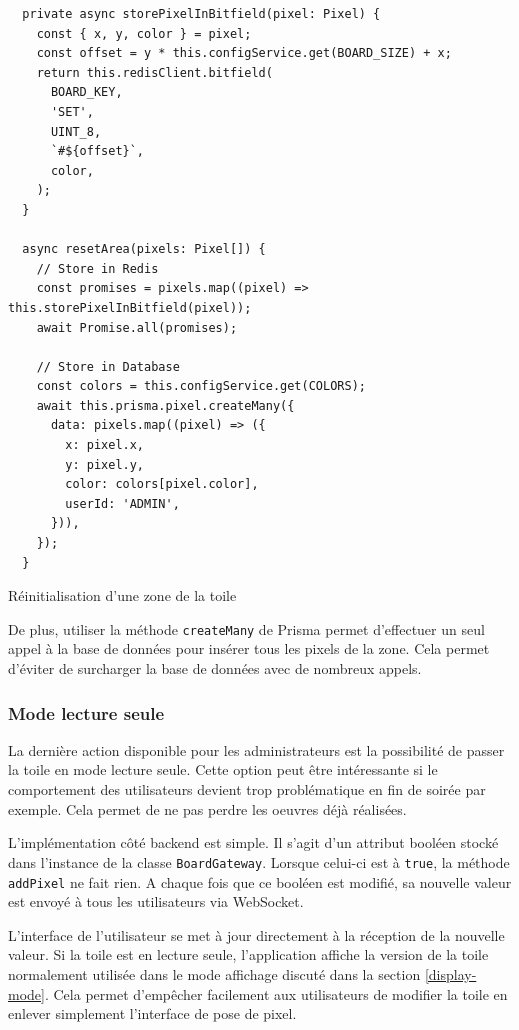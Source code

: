 \begin{listing}[h]
  \begin{verbatim}
  private async storePixelInBitfield(pixel: Pixel) {
    const { x, y, color } = pixel;
    const offset = y * this.configService.get(BOARD_SIZE) + x;
    return this.redisClient.bitfield(
      BOARD_KEY,
      'SET',
      UINT_8,
      `#${offset}`,
      color,
    );
  }

  async resetArea(pixels: Pixel[]) {
    // Store in Redis
    const promises = pixels.map((pixel) => this.storePixelInBitfield(pixel));
    await Promise.all(promises);

    // Store in Database
    const colors = this.configService.get(COLORS);
    await this.prisma.pixel.createMany({
      data: pixels.map((pixel) => ({
        x: pixel.x,
        y: pixel.y,
        color: colors[pixel.color],
        userId: 'ADMIN',
      })),
    });
  }
\end{verbatim}
  \caption{Réinitialisation d'une zone de la toile}
  \label{listing:admin-reset-area}
\end{listing}

De plus, utiliser la méthode \texttt{createMany} de Prisma permet d'effectuer un seul appel à la base de données pour insérer tous les pixels de la zone. Cela permet d'éviter de surcharger la base de données avec de nombreux appels.

\subsubsection{Mode lecture seule}

La dernière action disponible pour les administrateurs est la possibilité de passer la toile en mode lecture seule. Cette option peut être intéressante si le comportement des utilisateurs devient trop problématique en fin de soirée par exemple. Cela permet de ne pas perdre les oeuvres déjà réalisées.

L'implémentation côté backend est simple. Il s'agit d'un attribut booléen stocké dans l'instance de la classe \texttt{BoardGateway}. Lorsque celui-ci est à \texttt{true}, la méthode \texttt{addPixel} ne fait rien. A chaque fois que ce booléen est modifié, sa nouvelle valeur est envoyé à tous les utilisateurs via WebSocket.

L'interface de l'utilisateur se met à jour directement à la réception de la nouvelle valeur. Si la toile est en lecture seule, l'application affiche la version de la toile normalement utilisée dans le mode affichage discuté dans la section \ref{display-mode}. Cela permet d'empêcher facilement aux utilisateurs de modifier la toile en enlever simplement l'interface de pose de pixel.

